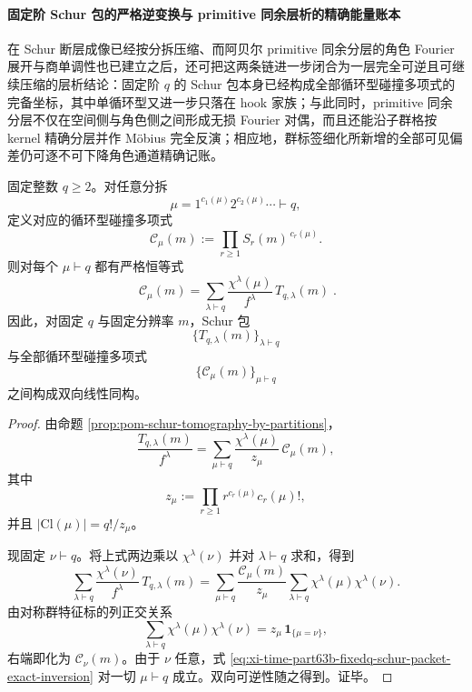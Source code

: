\paragraph{固定阶 Schur 包的严格逆变换与 primitive 同余层析的精确能量账本}
在 Schur 断层成像已经按分拆压缩、而阿贝尔 primitive 同余分层的角色 Fourier 展开与商单调性也已建立之后，还可把这两条链进一步闭合为一层完全可逆且可继续压缩的层析结论：固定阶 \(q\) 的 Schur 包本身已经构成全部循环型碰撞多项式的完备坐标，其中单循环型又进一步只落在 hook 家族；与此同时，primitive 同余分层不仅在空间侧与角色侧之间形成无损 Fourier 对偶，而且还能沿子群格按 kernel 精确分层并作 Möbius 完全反演；相应地，群标签细化所新增的全部可见偏差仍可逐不可下降角色通道精确记账。

\begin{theorem}\label{thm:xi-time-part63b-fixedq-schur-packet-exact-inversion}
固定整数 \(q\ge 2\)。对任意分拆
\[
\mu=1^{c_1(\mu)}2^{c_2(\mu)}\cdots \vdash q,
\]
定义对应的循环型碰撞多项式
\[
\mathcal C_\mu(m):=\prod_{r\ge 1}S_r(m)^{\,c_r(\mu)}.
\]
则对每个 \(\mu\vdash q\) 都有严格恒等式
\begin{equation}\label{eq:xi-time-part63b-fixedq-schur-packet-exact-inversion}
\boxed{\;
\mathcal C_\mu(m)
=
\sum_{\lambda\vdash q}\frac{\chi^\lambda(\mu)}{f^\lambda}\,T_{q,\lambda}(m)\; }.
\end{equation}
因此，对固定 \(q\) 与固定分辨率 \(m\)，Schur 包
\[
\{T_{q,\lambda}(m)\}_{\lambda\vdash q}
\]
与全部循环型碰撞多项式
\[
\{\mathcal C_\mu(m)\}_{\mu\vdash q}
\]
之间构成双向线性同构。
\end{theorem}
\begin{proof}
由命题 \ref{prop:pom-schur-tomography-by-partitions}，
\[
\frac{T_{q,\lambda}(m)}{f^\lambda}
=
\sum_{\mu\vdash q}\frac{\chi^\lambda(\mu)}{z_\mu}\,\mathcal C_\mu(m),
\]
其中
\[
z_\mu:=\prod_{r\ge 1}r^{c_r(\mu)}c_r(\mu)!,
\]
并且 \(|\mathrm{Cl}(\mu)|=q!/z_\mu\)。

现固定 \(\nu\vdash q\)。将上式两边乘以 \(\chi^\lambda(\nu)\) 并对 \(\lambda\vdash q\) 求和，得到
\[
\sum_{\lambda\vdash q}\frac{\chi^\lambda(\nu)}{f^\lambda}\,T_{q,\lambda}(m)
=
\sum_{\mu\vdash q}\frac{\mathcal C_\mu(m)}{z_\mu}
\sum_{\lambda\vdash q}\chi^\lambda(\mu)\chi^\lambda(\nu).
\]
由对称群特征标的列正交关系
\[
\sum_{\lambda\vdash q}\chi^\lambda(\mu)\chi^\lambda(\nu)
=
z_\mu\,\mathbf 1_{\{\mu=\nu\}},
\]
右端即化为 \(\mathcal C_\nu(m)\)。由于 \(\nu\) 任意，式
\eqref{eq:xi-time-part63b-fixedq-schur-packet-exact-inversion} 对一切 \(\mu\vdash q\) 成立。双向可逆性随之得到。证毕。
\end{proof}

